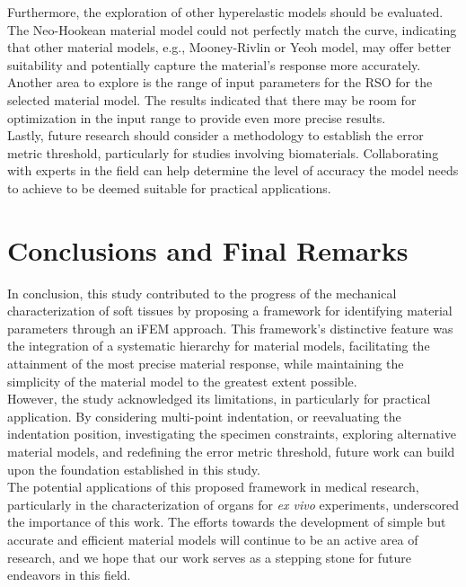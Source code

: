 Furthermore, the exploration of other hyperelastic models should be evaluated. The Neo-Hookean material 
model could not perfectly match the curve, indicating that other material models, e.g., Mooney-Rivlin or Yeoh model, may 
offer better suitability and potentially capture the material's response more accurately. Another area to explore is the range
 of input parameters for the RSO for the selected material model. The results indicated that there may be room 
for optimization in the input range to provide even more precise results.\\

Lastly, future research should consider a methodology to establish the error metric threshold, particularly for studies
involving biomaterials. Collaborating with experts in the field can help determine the level of accuracy the model 
needs to achieve to be deemed suitable for practical applications.

\section{Conclusions and Final Remarks}

In conclusion, this study contributed to the progress of the mechanical characterization of soft tissues
by proposing a framework for identifying material parameters through an iFEM approach. This framework's
distinctive feature was the integration of a systematic hierarchy for material models, facilitating the 
attainment of the most precise material response, while maintaining the simplicity of the material model to the 
greatest extent possible.\\

However, the study acknowledged its limitations, in particularly for practical application. By considering
multi-point indentation, or reevaluating the indentation position, investigating the specimen constraints, 
exploring alternative material models, and redefining the error metric threshold, future work can build upon the 
foundation established in this study.\\

The potential applications of this proposed framework in medical research, particularly in the characterization 
of organs for \textit{ex vivo} experiments, underscored the importance of this work. The efforts towards 
the development of simple but accurate and efficient material models will continue to be an active area
of research, and we hope that our work serves as a stepping stone for future endeavors in this field. 

